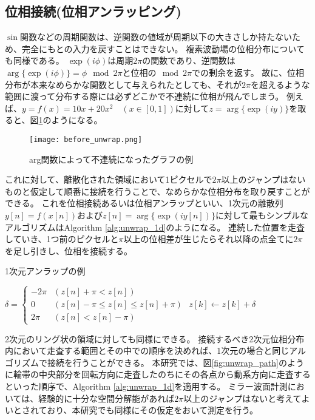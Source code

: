 \subsection{位相接続(位相アンラッピング)}
$\sin$関数などの周期関数は、逆関数の値域が周期以下の大きさしか持たないため、完全にもとの入力を戻すことはできない。
複素波動場の位相分布についても同様である。
$\exp(i\phi)$は周期$2\pi$の関数であり、逆関数は$\arg\{\exp(i\phi)\}=\phi \mod{2\pi}$と位相の$\mod{2\pi}$での剰余を返す。
故に、位相分布が本来なめらかな関数として与えられたとしても、それが$2\pi$を超えるような範囲に渡って分布する際には必ずどこかで不連続に位相が飛んでしまう。
例えば、$y = f(x) = 10x + 20x^2 \quad (x \in [0, 1])$に対して$z = \arg\{\exp(iy)\}$を取ると、図\ref{fig:wrapped_graph_example}のようになる。

\begin{figure}[ht]
\centering
\texttt{[image: before\_unwrap.png]}
\caption{arg関数によって不連続になったグラフの例}
\label{fig:wrapped_graph_example}
\end{figure}

これに対して、離散化された領域において1ピクセルで$2\pi$以上のジャンプはないものと仮定して順番に接続を行うことで、なめらかな位相分布を取り戻すことができる。
これを位相接続あるいは位相アンラップといい、1次元の離散列$y[n] = f(x[n])$および$z[n]=\arg\{\exp(iy[n])\}$に対して最もシンプルなアルゴリズムはAlgorithm \ref{alg:unwrap_1d}のようになる。
連続した位置を走査していき、1つ前のピクセルと$\pi$以上の位相差が生じたらそれ以降の点全てに$2\pi$を足し引きし、位相を接続する。

\begin{algorithm}                      
\caption{1次元アンラップの例}         
\label{alg:unwrap_1d}                          
\begin{algorithmic}
        \STATE $\delta = \begin{cases}
                -2 \pi & (z[n] + \pi < z[n]) \\
                0 & (z[n] - \pi \leq z[n] \leq z[n] + \pi) \\
                2 \pi & (z[n] < z[n] - \pi)
            \end{cases}$
            \STATE $z[k] \leftarrow z[k] + \delta$
        \ENDFOR
    \ENDFOR
\end{algorithmic}
\end{algorithm}

2次元のリング状の領域に対しても同様にできる。
接続するべき2次元位相分布内において走査する範囲とその中での順序を決めれば、1次元の場合と同じアルゴリズムで接続を行うことができる。
本研究では、図\ref{fig:unwrap_path}のように輪帯の中央部分を回転方向に走査したのちにその各点から動系方向に走査するといった順序で、Algorithm \ref{alg:unwrap_1d}を適用する。
ミラー波面計測においては、経験的に十分な空間分解能があれば$2\pi$以上のジャンプはないと考えてよいとされており、本研究でも同様にその仮定をおいて測定を行う。

